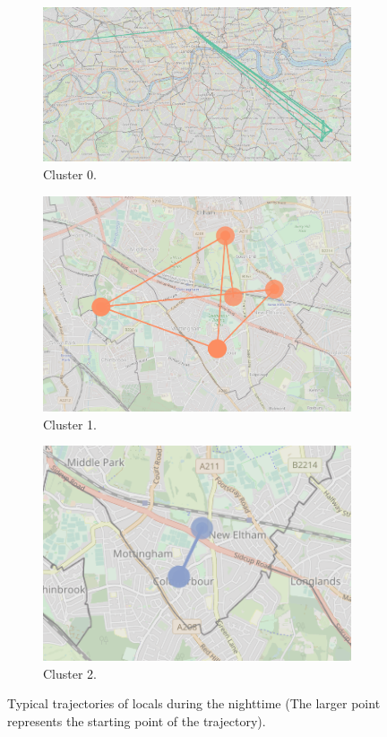 \documentclass{article}
\theoremstyle{remark}
\begin{document}
\begin{figure}[!h]

\centering
\begin{subfigure}{0.6\textheight}
\centering
\includegraphics[width=0.4\linewidth]{figures/nighttime_locals_c0.png}
\caption{Cluster 0.}
\label{fig:nighttime_locals_c0}
\end{subfigure}
\begin{subfigure}{0.6\textheight}
\centering
\includegraphics[width=0.4\linewidth]{figures/nighttime_locals_c1.png}
\caption{Cluster 1.}
\label{fig:nighttime_locals_c1}
\end{subfigure}
\begin{subfigure}{0.6\textheight}
\centering
\includegraphics[width=0.4\linewidth]{figures/nighttime_locals_c2.png}
\caption{Cluster 2.}
\label{fig:nighttime_locals_c2}
\end{subfigure}

\caption{Typical trajectories of locals during the nighttime (The larger point represents the starting point of the trajectory).}
\label{fig:sequences_nighttime_locals}
\end{figure}
\end{document}
